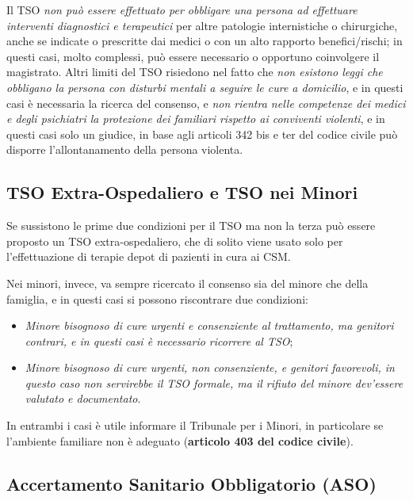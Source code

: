 Il TSO \emph{non può essere effettuato per obbligare una persona ad
effettuare interventi diagnostici e terapeutici} per altre patologie
internistiche o chirurgiche, anche se indicate o prescritte dai medici o
con un alto rapporto benefici/rischi; in questi casi, molto complessi,
può essere necessario o opportuno coinvolgere il magistrato. Altri
limiti del TSO risiedono nel fatto che \emph{non esistono leggi che
obbligano la persona con disturbi mentali a seguire le cure a
domicilio}, e in questi casi è necessaria la ricerca del consenso, e
\emph{non rientra nelle competenze dei medici e degli psichiatri la
protezione dei familiari rispetto ai conviventi violenti}, e in questi
casi solo un giudice, in base agli articoli 342 bis e ter del codice
civile può disporre l'allontanamento della persona violenta.

\subsection{TSO Extra-Ospedaliero e TSO nei Minori}

Se sussistono le prime due condizioni per il TSO ma non la terza può
essere proposto un TSO extra-ospedaliero, che di solito viene usato solo
per l'effettuazione di terapie depot di pazienti in cura ai CSM.

Nei minori, invece, va sempre ricercato il consenso sia del minore che
della famiglia, e in questi casi si possono riscontrare due condizioni:

\begin{itemize}
\item
  \emph{Minore bisognoso di cure urgenti e consenziente al trattamento,
  ma genitori contrari, e in questi casi è necessario ricorrere al TSO};
\item
  \emph{Minore bisognoso di cure urgenti, non consenziente, e genitori
  favorevoli, in questo caso non servirebbe il TSO formale, ma il
  rifiuto del minore dev'essere valutato e documentato}.
\end{itemize}

In entrambi i casi è utile informare il Tribunale per i Minori, in
particolare se l'ambiente familiare non è adeguato (\textbf{articolo 403
del codice civile}).

\subsection{Accertamento Sanitario Obbligatorio (ASO)}

